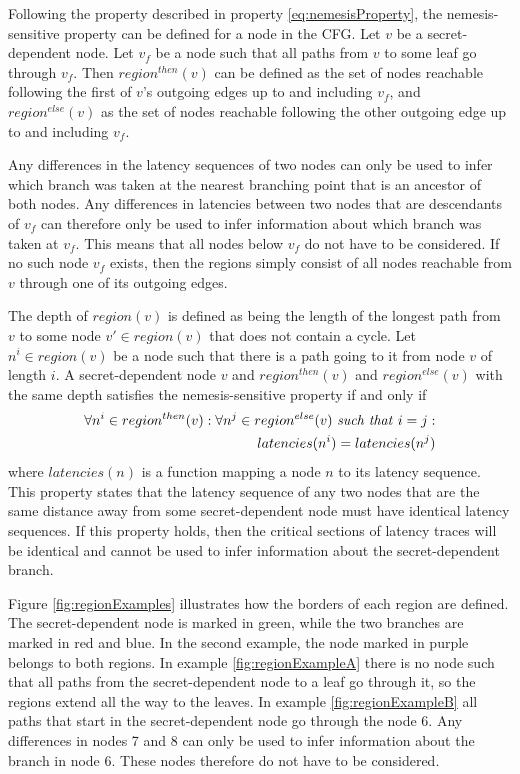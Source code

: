 Following the property described in property \ref{eq:nemesisProperty}, the nemesis-sensitive property can be defined for a node in the CFG. Let $v$ be a secret-dependent node. 
Let $v_f$ be a node such that all paths from $v$ to some leaf go through $v_f$. Then $region^{then}(v)$ can be defined as the set of nodes reachable following the 
first of $v$'s outgoing edges up to and including $v_f$, and $region^{else}(v)$ as the set of nodes reachable following the other outgoing edge up to and including $v_f$.

Any differences in the latency sequences of two nodes can only be used to infer which branch was taken at the nearest branching point that is an ancestor of both nodes. 
Any differences in latencies between two nodes that are descendants of $v_f$ can therefore only be used to infer information about which branch was taken at $v_f$. 
This means that all nodes below $v_f$ do not have to be considered. If no such node $v_f$ exists, then the regions simply consist of all nodes reachable from $v$ through one of its outgoing edges. 

The depth of $region(v)$ is defined as being the length of the longest path from $v$ to some node $v' \in region(v)$ that does not contain a cycle.
Let $n^i \in region(v)$ be a node such that there is a path going to it from node $v$ of length $i$. 
A secret-dependent node $v$ and $region^{then}(v)$ and $region^{else}(v)$ with the same depth satisfies the nemesis-sensitive property if and only if 
\begin{equation} \label{eq:nemesisPropertyNode}
    \begin{split}
    \forall n^i \in region^{then}(v) : \forall n^j \in region^{else}(v) \text{ \textit{such that} } i=j :  \\ 
    latencies(n^i) = latencies(n^j)
    \end{split}
\end{equation}
where $latencies(n)$ is a function mapping a node $n$ to its latency sequence. This property states that the latency sequence of any two nodes that are the same distance away 
from some secret-dependent node must have identical latency sequences. If this property holds, then the critical sections of latency traces will be identical and cannot be used to 
infer information about the secret-dependent branch. 

Figure \ref{fig:regionExamples} illustrates how the borders of each region are defined. The secret-dependent node is marked in green, while the two branches are marked in red and blue. In the second example, the node marked in purple belongs to both regions. In example \ref{fig:regionExampleA} there is no node such that all paths from the secret-dependent node to a leaf go through it, so the regions extend all the way to the leaves. In example \ref{fig:regionExampleB} all paths that start in the secret-dependent node go through the node 6. Any differences in nodes 7 and 8 can only be used to infer information about the branch in node 6. These nodes therefore do not have to be considered.  

